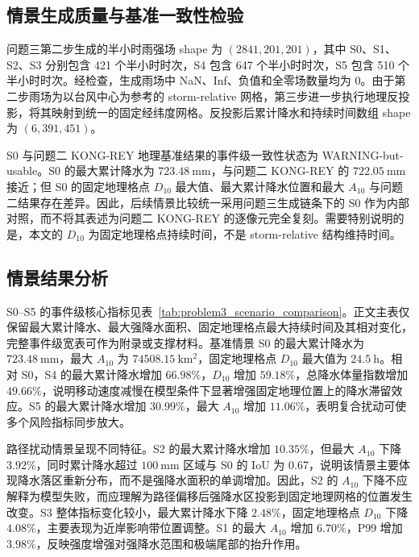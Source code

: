 \documentclass[UTF8,a4paper,zihao=5,fontset=fandol]{ctexart}
\numberwithin{equation}{section}
\numberwithin{figure}{section}
\numberwithin{table}{section}
\begin{document}
\subsection{情景生成质量与基准一致性检验}

问题三第二步生成的半小时雨强场 shape 为 $(2841,201,201)$，其中 S0、S1、S2、S3 分别包含 421 个半小时时次，S4 包含 647 个半小时时次，S5 包含 510 个半小时时次。经检查，生成雨场中 NaN、Inf、负值和全零场数量均为 0。由于第二步雨场为以台风中心为参考的 storm-relative 网格，第三步进一步执行地理反投影，将其映射到统一的固定经纬度网格。反投影后累计降水和持续时间数组 shape 为 $(6,391,451)$。

S0 与问题二 KONG-REY 地理基准结果的事件级一致性状态为 WARNING-but-usable。S0 的最大累计降水为 $723.48\ \mathrm{mm}$，与问题二 KONG-REY 的 $722.05\ \mathrm{mm}$ 接近；但 S0 的固定地理格点 $D_{10}$ 最大值、最大累计降水位置和最大 $A_{10}$ 与问题二结果存在差异。因此，后续情景比较统一采用问题三生成链条下的 S0 作为内部对照，而不将其表述为问题二 KONG-REY 的逐像元完全复刻。需要特别说明的是，本文的 $D_{10}$ 为固定地理格点持续时间，不是 storm-relative 结构维持时间。

\subsection{情景结果分析}

S0--S5 的事件级核心指标见表~\ref{tab:problem3_scenario_comparison}。正文主表仅保留最大累计降水、最大强降水面积、固定地理格点最大持续时间及其相对变化，完整事件级宽表可作为附录或支撑材料。基准情景 S0 的最大累计降水为 $723.48\ \mathrm{mm}$，最大 $A_{10}$ 为 $74508.15\ \mathrm{km^2}$，固定地理格点 $D_{10}$ 最大值为 $24.5\ \mathrm{h}$。相对 S0，S4 的最大累计降水增加 $66.98\%$，$D_{10}$ 增加 $59.18\%$，总降水体量指数增加 $49.66\%$，说明移动速度减慢在模型条件下显著增强固定地理位置上的降水滞留效应。S5 的最大累计降水增加 $30.99\%$，最大 $A_{10}$ 增加 $11.06\%$，表明复合扰动可使多个风险指标同步放大。



路径扰动情景呈现不同特征。S2 的最大累计降水增加 $10.35\%$，但最大 $A_{10}$ 下降 $3.92\%$，同时累计降水超过 $100\ \mathrm{mm}$ 区域与 S0 的 IoU 为 0.67，说明该情景主要体现降水落区重新分布，而不是强降水面积的单调增加。因此，S2 的 $A_{10}$ 下降不应解释为模型失败，而应理解为路径偏移后强降水区投影到固定地理网格的位置发生改变。S3 整体指标变化较小，最大累计降水下降 $2.48\%$，固定地理格点 $D_{10}$ 下降 $4.08\%$，主要表现为近岸影响带位置调整。S1 的最大 $A_{10}$ 增加 $6.70\%$，P99 增加 $3.98\%$，反映强度增强对强降水范围和极端尾部的抬升作用。
\end{document}
